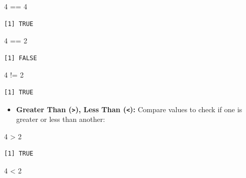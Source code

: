 \documentclass[
  letterpaper,
  DIV=11,
  numbers=noendperiod]{scrreprt}
\newenvironment{Shaded}{\begin{snugshade}}{\end{snugshade}}
\newcommand{\DecValTok}[1]{\textcolor[rgb]{0.68,0.00,0.00}{#1}}
\newcommand{\SpecialCharTok}[1]{\textcolor[rgb]{0.37,0.37,0.37}{#1}}
\providecommand{\tightlist}{%
  \setlength{\itemsep}{0pt}\setlength{\parskip}{0pt}}\usepackage{longtable,booktabs,array}
\begin{document}
\begin{Shaded}
\begin{Highlighting}[]
\DecValTok{4} \SpecialCharTok{==} \DecValTok{4}
\end{Highlighting}
\end{Shaded}

\begin{verbatim}
[1] TRUE
\end{verbatim}

\begin{Shaded}
\begin{Highlighting}[]
\DecValTok{4} \SpecialCharTok{==} \DecValTok{2}
\end{Highlighting}
\end{Shaded}

\begin{verbatim}
[1] FALSE
\end{verbatim}

\begin{Shaded}
\begin{Highlighting}[]
\DecValTok{4} \SpecialCharTok{!=} \DecValTok{2}
\end{Highlighting}
\end{Shaded}

\begin{verbatim}
[1] TRUE
\end{verbatim}

\begin{itemize}
\tightlist
\item
  \textbf{Greater Than (\texttt{\textgreater{}}), Less Than
  (\texttt{\textless{}}):} Compare values to check if one is greater or
  less than another:
\end{itemize}

\begin{Shaded}
\begin{Highlighting}[]
\DecValTok{4} \SpecialCharTok{\textgreater{}} \DecValTok{2}
\end{Highlighting}
\end{Shaded}

\begin{verbatim}
[1] TRUE
\end{verbatim}

\begin{Shaded}
\begin{Highlighting}[]
\DecValTok{4} \SpecialCharTok{\textless{}} \DecValTok{2}
\end{Highlighting}
\end{Shaded}
\end{document}
